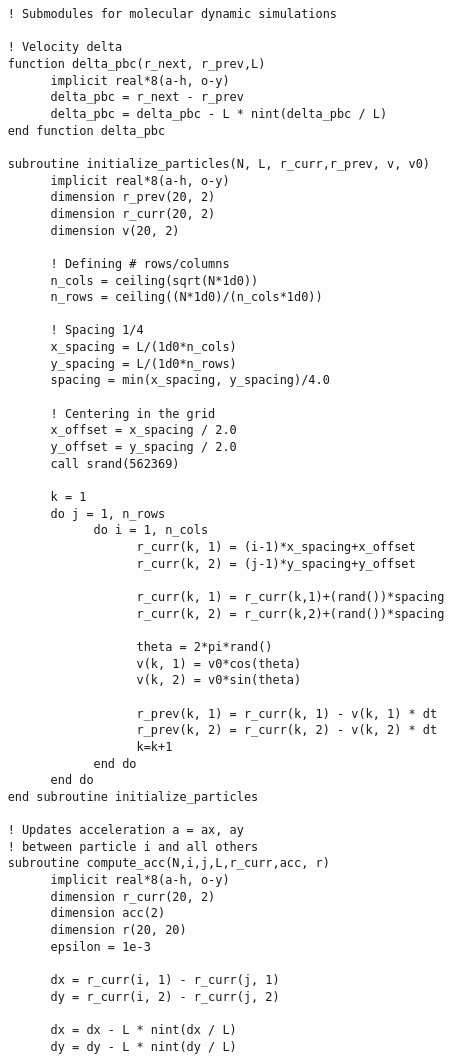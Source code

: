 \begin{verbatim}
    ! Submodules for molecular dynamic simulations
    
    ! Velocity delta 
    function delta_pbc(r_next, r_prev,L)
          implicit real*8(a-h, o-y)
          delta_pbc = r_next - r_prev
          delta_pbc = delta_pbc - L * nint(delta_pbc / L)
    end function delta_pbc

    subroutine initialize_particles(N, L, r_curr,r_prev, v, v0)
          implicit real*8(a-h, o-y)
          dimension r_prev(20, 2)
          dimension r_curr(20, 2)
          dimension v(20, 2)
         
          ! Defining # rows/columns 
          n_cols = ceiling(sqrt(N*1d0))
          n_rows = ceiling((N*1d0)/(n_cols*1d0)) 
          
          ! Spacing 1/4 
          x_spacing = L/(1d0*n_cols)
          y_spacing = L/(1d0*n_rows)
          spacing = min(x_spacing, y_spacing)/4.0 
          
          ! Centering in the grid
          x_offset = x_spacing / 2.0 
          y_offset = y_spacing / 2.0
          call srand(562369)

          k = 1 
          do j = 1, n_rows 
                do i = 1, n_cols 
                      r_curr(k, 1) = (i-1)*x_spacing+x_offset
                      r_curr(k, 2) = (j-1)*y_spacing+y_offset
                      
                      r_curr(k, 1) = r_curr(k,1)+(rand())*spacing
                      r_curr(k, 2) = r_curr(k,2)+(rand())*spacing

                      theta = 2*pi*rand()
                      v(k, 1) = v0*cos(theta)
                      v(k, 2) = v0*sin(theta)
                      
                      r_prev(k, 1) = r_curr(k, 1) - v(k, 1) * dt 
                      r_prev(k, 2) = r_curr(k, 2) - v(k, 2) * dt 
                      k=k+1
                end do 
          end do
    end subroutine initialize_particles

    ! Updates acceleration a = ax, ay 
    ! between particle i and all others
    subroutine compute_acc(N,i,j,L,r_curr,acc, r)
          implicit real*8(a-h, o-y)
          dimension r_curr(20, 2)
          dimension acc(2)
          dimension r(20, 20)
          epsilon = 1e-3

          dx = r_curr(i, 1) - r_curr(j, 1)
          dy = r_curr(i, 2) - r_curr(j, 2)

          dx = dx - L * nint(dx / L)
          dy = dy - L * nint(dy / L)


\end{verbatim}
